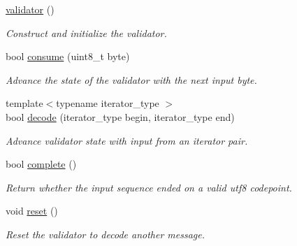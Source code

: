 \begin{DoxyCompactItemize}
\item 
\hyperlink{classwebsocketpp_1_1utf8__validator_1_1validator_a41ea90fb7c6b34d41a8e6e71a6b04346}{validator} ()\hypertarget{classwebsocketpp_1_1utf8__validator_1_1validator_a41ea90fb7c6b34d41a8e6e71a6b04346}{}\label{classwebsocketpp_1_1utf8__validator_1_1validator_a41ea90fb7c6b34d41a8e6e71a6b04346}

\begin{DoxyCompactList}\small\item\em Construct and initialize the validator. \end{DoxyCompactList}\item 
bool \hyperlink{classwebsocketpp_1_1utf8__validator_1_1validator_ada7f6cdd4261d848d51d7ba0bd9d28b4}{consume} (uint8\+\_\+t byte)
\begin{DoxyCompactList}\small\item\em Advance the state of the validator with the next input byte. \end{DoxyCompactList}\item 
{\footnotesize template$<$typename iterator\+\_\+type $>$ }\\bool \hyperlink{classwebsocketpp_1_1utf8__validator_1_1validator_a2cde6cad6f1a0f66674010848ec80fba}{decode} (iterator\+\_\+type begin, iterator\+\_\+type end)
\begin{DoxyCompactList}\small\item\em Advance validator state with input from an iterator pair. \end{DoxyCompactList}\item 
bool \hyperlink{classwebsocketpp_1_1utf8__validator_1_1validator_a89deb3bdfd8b94da908b806e543491ba}{complete} ()
\begin{DoxyCompactList}\small\item\em Return whether the input sequence ended on a valid utf8 codepoint. \end{DoxyCompactList}\item 
void \hyperlink{classwebsocketpp_1_1utf8__validator_1_1validator_a98aa3058213a650997bd832cc003da75}{reset} ()\hypertarget{classwebsocketpp_1_1utf8__validator_1_1validator_a98aa3058213a650997bd832cc003da75}{}\label{classwebsocketpp_1_1utf8__validator_1_1validator_a98aa3058213a650997bd832cc003da75}

\begin{DoxyCompactList}\small\item\em Reset the validator to decode another message. \end{DoxyCompactList}\end{DoxyCompactItemize}


